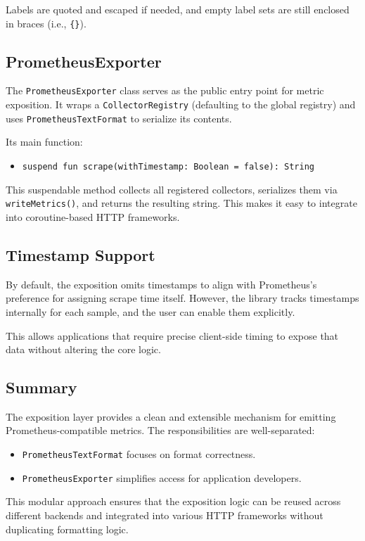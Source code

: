 Labels are quoted and escaped if needed, and empty label sets are still enclosed in braces (i.e., \texttt{\{\}}).

\subsection{PrometheusExporter}\label{subsec:prometheusexporter}

The \texttt{PrometheusExporter} class serves as the public entry point for metric exposition.
It wraps a \texttt{CollectorRegistry} (defaulting to the global registry) and uses \texttt{PrometheusTextFormat} to serialize its contents.

Its main function:

\begin{itemize}
    \item \texttt{suspend fun scrape(withTimestamp: Boolean = false): String}
\end{itemize}

This suspendable method collects all registered collectors, serializes them via \texttt{writeMetrics()}, and returns the resulting string.
This makes it easy to integrate into coroutine-based HTTP frameworks.

\subsection{Timestamp Support}\label{subsec:timestamp-support}

By default, the exposition omits timestamps to align with Prometheus's preference for assigning scrape time itself.
However, the library tracks timestamps internally for each sample, and the user can enable them explicitly.

This allows applications that require precise client-side timing to expose that data without altering the core logic.

\subsection{Summary}\label{subsec:summary}

The exposition layer provides a clean and extensible mechanism for emitting Prometheus-compatible metrics.
The responsibilities are well-separated:

\begin{itemize}
    \item \texttt{PrometheusTextFormat} focuses on format correctness.
    \item \texttt{PrometheusExporter} simplifies access for application developers.
\end{itemize}

This modular approach ensures that the exposition logic can be reused across different backends and integrated into various HTTP frameworks without duplicating formatting logic.
